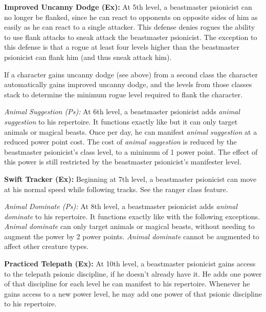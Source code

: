 {\textbf{Improved Uncanny Dodge (Ex):} At 5th level, a beastmaster psionicist can no longer be flanked, since he can react to opponents on opposite sides of him as easily as he can react to a single attacker. This defense denies rogues the ability to use flank attacks to sneak attack the beastmaster psionicist. The exception to this defense is that a rogue at least four levels higher than the beastmaster psionicist can flank him (and thus sneak attack him).

If a character gains uncanny dodge (see above) from a second class the character automatically gains improved uncanny dodge, and the levels from those classes stack to determine the minimum rogue level required to flank the character.

\textit{Animal Suggestion (Ps):} At 6th level, a beastmaster psionicist adds \emph{animal suggestion} to his repertoire. It functions exactly like  but it can only target animals or magical beasts. Once per day, he can manifest \emph{animal suggestion} at a reduced power point cost. The cost of \emph{animal suggestion} is reduced by the beastmaster psionicist's class level, to a minimum of 1 power point. The effect of this power is still restricted by the beastmaster psionicist's manifester level.

\textbf{Swift Tracker (Ex):} Beginning at 7th level, a beastmaster psionicist can move at his normal speed while following tracks. See the ranger class feature.

\textit{Animal Dominate (Ps):} At 8th level, a beastmaster psionicist adds \emph{animal dominate} to his repertoire. It functions exactly like  with the following exceptions. \emph{Animal dominate} can only target animals or magical beasts, without needing to augment the power by 2 power points. \emph{Animal dominate} cannot be augmented to affect other creature types.

\textbf{Practiced Telepath (Ex):} At 10th level, a beastmaster psionicist gains access to the telepath psionic discipline, if he doesn't already have it. He adds one power of that discipline for each level he can manifest to his repertoire. Whenever he gains access to a new power level, he may add one power of that psionic discipline to his repertoire.

}
